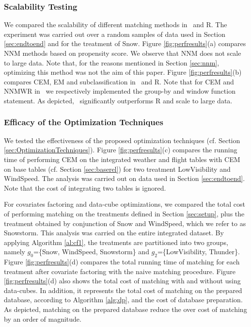 \vspace{-.25cm}
\subsubsection{Scalability Testing}
\label{sec:sct}
We compared the scalability of different matching methods in \GSQL \ and R. The experiment was carried out over
a random samples of data used in Section \ref{sec:endtoend} and for the treatment of Snow. Figure \ref{fig:perfresults}(a) compares NNM methods based on propensity score. We observe that NNM does not scale to large data. Note that, for the reasons mentioned in Section \ref{sec:nnm}, optimizing this method was not the aim of this paper. Figure \ref{fig:perfresults}(b)  compares CEM, EM and subclassification in \GSQL \ and R. Note that for CEM and NNMWR in \GSQL\, we respectively implemented the group-by and window function statement. As depicted,  \GSQL \ significantly outperforms R and scale to large data.



\vspace{-.25cm}
\subsubsection{Efficacy of the Optimization Techniques}
\label{sec:opt}
We tested the effectiveness of the proposed optimization techniques (cf. Section \ref{sec:OptimizationTechniques}). Figure \ref{fig:perfresults}(c) compares the running time of performing CEM on
the integrated weather and flight tables with CEM on base tables (cf. Section \ref{sec:baserel})
for two treatment LowVisibility and WindSpeed.  The analysis was carried out on data used in Section \ref{sec:endtoend}. Note that the cost of integrating two tables is ignored.


For covariates factoring and data-cube optimizations, we compared the
total cost of performing matching on the treatments defined in Section
\ref{sec:setup}, plus the treatment obtained by conjunction of Snow and
WindSpeed, which we refer to as Snowstorm. This analysis was carried
on the entire integrated dataset. By applying Algorithm \ref{al:cf1},
the treatments are partitioned into two groups, namely $g_0$=\{Snow,
WindSpeed, Snowstorm\} and $g_2$=\{LowVisibility, Thunder\}.  Figure
\ref{fig:perfresults}(d) compares the total running time of matching
for each treatment after covariate factoring with the naive matching
procedure. Figure \ref{fig:perfresults}(d)  also shows the total cost of matching with and without using data-cubes.
 In addition, it represents the total cost of matching on the prepared database, according to Algorithm \ref{alg:dp}, and the cost of database preparation. As depicted,  matching on the prepared database
reduce the over cost of matching by an order of magnitude.  


